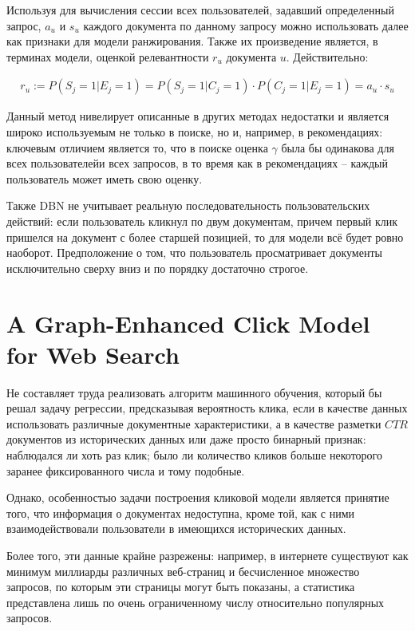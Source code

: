 \documentclass[diploma]{nanolab2015}
\begin{document}
Используя для вычисления сессии всех пользователей, задавший определенный запрос, $a_u$ и $s_u$ каждого документа по данному запросу можно использовать далее как признаки для модели ранжирования. Также их произведение является, в терминах модели, оценкой релевантности $r_u$ документа $u$. Действительно:

\begin{align}
    r_u := P(S_j=1 | E_j = 1) = P(S_j = 1 | C_j = 1) \cdot P(C_j = 1 | E_j = 1) = a_u \cdot s_u
\end{align}

Данный метод нивелирует описанные в других методах недостатки и является широко используемым не только в поиске, но и, например, в рекомендациях: ключевым отличием является то, что в поиске оценка $\gamma$ была бы одинакова для всех пользователейи всех запросов, в то время как в рекомендациях -- каждый пользователь может иметь свою оценку.

Также DBN не учитывает реальную последовательность пользовательских действий: если пользователь кликнул по двум документам, причем первый клик пришелся на документ с более старшей позицией, то для модели всё будет ровно наоборот. Предположение о том, что пользователь просматривает документы исключительно сверху вниз и по порядку достаточно строгое.

\section{A Graph-Enhanced Click Model for Web Search}
Не составляет труда реализовать алгоритм машинного обучения, который бы решал задачу регрессии, предсказывая вероятность клика, если в качестве данных использовать различные документные характеристики, а в качестве разметки $CTR$ документов из исторических данных или даже просто бинарный признак: наблюдался ли хоть раз клик; было ли количество кликов больше некоторого заранее фиксированного числа и тому подобные.

Однако, особенностью задачи построения кликовой модели является принятие того, что информация о документах недоступна, кроме той, как с ними взаимодействовали пользователи в имеющихся исторических данных.

Более того, эти данные крайне разрежены: например, в интернете существуют как минимум миллиарды различных веб-страниц и бесчисленное множество запросов, по которым эти страницы могут быть показаны, а статистика представлена лишь по очень ограниченному числу относительно популярных запросов.
\end{document}
